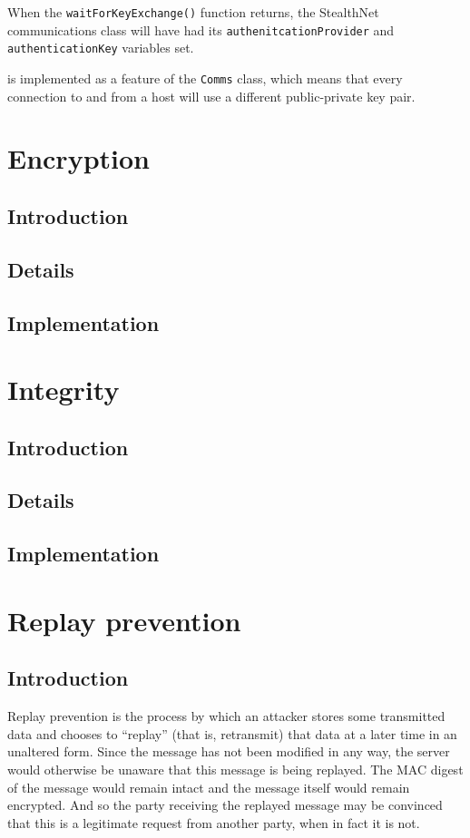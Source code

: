\documentclass[a4paper,11pt]{article}
\begin{document}
When the \verb+waitForKeyExchange()+ function returns, the StealthNet 
communications class will have had its \verb+authenitcationProvider+ and 
\verb+authenticationKey+ variables set.

 is implemented as a feature of the
\serviceName{} \verb+Comms+ class, which means that every connection to and from
a host will use a different public-private key pair.
 
\section{Encryption}

\subsection{Introduction}

\subsection{Details}

\subsection{Implementation}

\section{Integrity}

\subsection{Introduction}

\subsection{Details}

\subsection{Implementation}

\section{Replay prevention}

\subsection{Introduction}
Replay prevention is the process by which an attacker stores some transmitted 
data and chooses to ``replay'' (that is, retransmit) that data at a later time 
in an unaltered form. Since the message has not been modified in any way, the 
server would otherwise be unaware that this message is being replayed. The MAC
digest of the message would remain intact and the message itself would remain
encrypted. And so the party receiving the replayed message may be convinced that
this is a legitimate request from another party, when in fact it is not.
\end{document}
